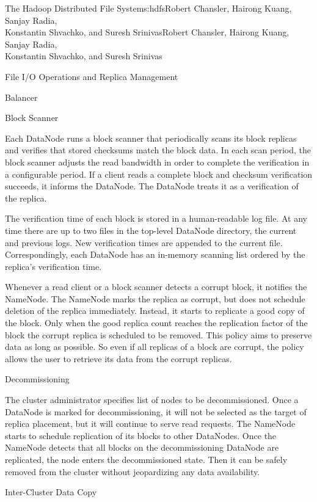 \begin{aosachaptertoc}{The Hadoop Distributed File System}{s:hdfs}{Robert Chansler, Hairong Kuang, Sanjay Radia, \\ Konstantin Shvachko, and Suresh Srinivas}{Robert Chansler, Hairong Kuang, Sanjay Radia, \\ \hspace*{0.9cm} Konstantin Shvachko, and Suresh Srinivas}
\begin{aosasect1}{File I/O Operations and Replica Management}
\begin{aosasect2}{Balancer}
\end{aosasect2}

\begin{aosasect2}{Block Scanner}

Each DataNode runs a block scanner that periodically scans its block
replicas and verifies that stored checksums match the block data. In
each scan period, the block scanner adjusts the read bandwidth in
order to complete the verification in a configurable period. If a
client reads a complete block and checksum verification succeeds, it
informs the DataNode. The DataNode treats it as a verification of the
replica.

The verification time of each block is stored in a human-readable log
file. At any time there are up to two files in the top-level DataNode
directory, the current and previous logs. New verification times are
appended to the current file. Correspondingly, each DataNode has an
in-memory scanning list ordered by the replica's verification time.

Whenever a read client or a block scanner detects a corrupt block, it
notifies the NameNode. The NameNode marks the replica as corrupt, but
does not schedule deletion of the replica immediately. Instead, it
starts to replicate a good copy of the block. Only when the good
replica count reaches the replication factor of the block the corrupt
replica is scheduled to be removed. This policy aims to preserve data
as long as possible. So even if all replicas of a block are corrupt,
the policy allows the user to retrieve its data from the corrupt
replicas.

\end{aosasect2}

\begin{aosasect2}{Decommissioning}

The cluster administrator specifies list of nodes to be
decommissioned.  Once a DataNode is marked for decommissioning, it
will not be selected as the target of replica placement, but it will
continue to serve read requests. The NameNode starts to schedule
replication of its blocks to other DataNodes. Once the NameNode
detects that all blocks on the decommissioning DataNode are
replicated, the node enters the decommissioned state. Then it can be
safely removed from the cluster without jeopardizing any data
availability.

\end{aosasect2}

\begin{aosasect2}{Inter-Cluster Data Copy}


\end{aosasect2}
\end{aosasect1}
\end{aosachaptertoc}
